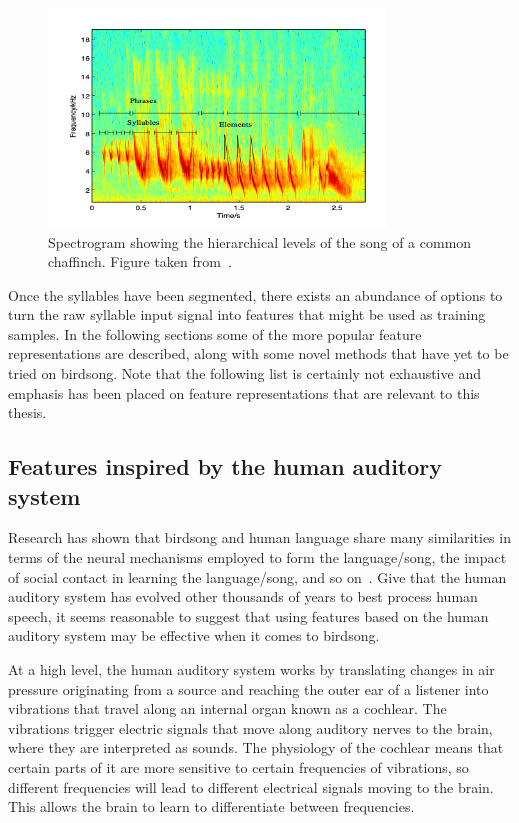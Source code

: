 \begin{figure}[ht]
  \centering
  \includegraphics[width=0.8\textwidth]{figures/syllables.png}
  \caption{Spectrogram showing the hierarchical levels of the song of a common
  chaffinch. Figure taken from~\cite{fagerlund2004automatic}.}\label{fig:syllables}
\end{figure}

Once the syllables have been segmented, there exists an abundance of options to
turn the raw syllable input signal into features that might be used as training
samples. In the following sections some of the more popular feature
representations are described, along with some novel methods that have yet to be
tried on birdsong. Note that the following list is certainly not exhaustive and
emphasis has been placed on feature representations that are relevant to this
thesis.

\subsection{Features inspired by the human auditory system}

Research has shown that birdsong and human language share many similarities in
terms of the neural mechanisms employed to form the language/song, the impact of
social contact in learning the language/song, and so on~\cite{birdsongspeech}.
Give that the human auditory system has evolved other thousands of years to best
process human speech, it seems reasonable to suggest that using features based
on the human auditory system may be effective when it comes to birdsong.

At a high level, the human auditory system works by translating changes in air
pressure originating from a source and reaching the outer ear of a listener
into vibrations that travel along an internal organ known as a cochlear. The
vibrations trigger electric signals that move along auditory nerves to the
brain, where they are interpreted as sounds. The physiology of the cochlear
means that certain parts of it are more sensitive to certain frequencies
of vibrations, so different frequencies will lead to different electrical
signals moving to the brain. This allows the brain to learn to differentiate
between frequencies.

